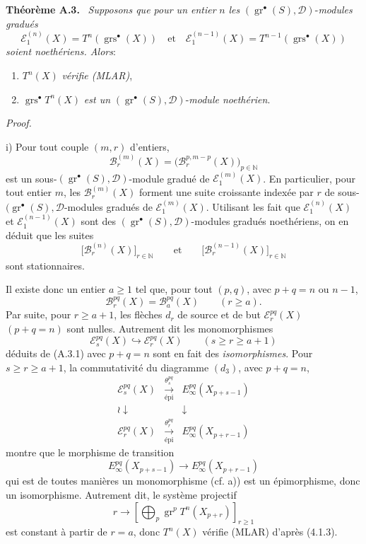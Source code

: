 \documentclass[11pt]{article}
\newenvironment{statement}[1]{\par\medskip\noindent\textbf{#1.}\ }{\par\medskip}
\newenvironment{prooftext}[1][Proof]{\par\noindent\emph{#1.}\ }{\par\medskip}
\providecommand{\gr}{\operatorname{gr}}
\providecommand{\gr}{\operatorname{gr}}
\providecommand{\gr}{\operatorname{gr}}
\providecommand{\grs}{\operatorname{grs}}
\begin{document}
\begin{statement}{Théorème A.3}
\emph{Supposons que pour un entier} \(n\) \emph{les} \((\gr^\bullet(S),\mathcal D)\)-\emph{modules gradués}
\[
\mathcal E_1^{(n)}(X)=T^n(\grs^\bullet(X))
\quad\text{et}\quad
\mathcal E_1^{(n-1)}(X)=T^{n-1}(\grs^\bullet(X))
\]
\emph{soient noethériens. Alors}:
\begin{enumerate}[label=\textup{(\roman*)}]
\item \(T^n(X)\) \emph{vérifie (MLAR)},
\item \(\grs^\bullet T^n(X)\) \emph{est un} \((\gr^\bullet(S),\mathcal D)\)-\emph{module noethérien}.
\end{enumerate}
\end{statement}

\begin{prooftext}

i) Pour tout couple \((m,r)\) d'entiers,
\[
\mathcal B_r^{(m)}(X)=\bigl(\mathcal B_r^{p,m-p}(X)\bigr)_{p\in\mathbb N}
\]
est un sous-\((\gr^\bullet(S),\mathcal D)\)-module gradué de \(\mathcal E_1^{(m)}(X)\). En particulier, pour tout entier \(m\), les \(\mathcal B_r^{(m)}(X)\) forment une suite croissante indexée par \(r\) de sous-\((\gr^\bullet(S),\mathcal D\)-modules gradués de \(\mathcal E_1^{(m)}(X)\). Utilisant les fait que \(\mathcal E_1^{(n)}(X)\) et \(\mathcal E_1^{(n-1)}(X)\) sont des \((\gr^\bullet(S),\mathcal D)\)-modules gradués noethériens, on en déduit que les suites
\[
\bigl[\mathcal B_r^{(n)}(X)\bigr]_{r\in\mathbb N}
\qquad\text{et}\qquad
\bigl[\mathcal B_r^{(n-1)}(X)\bigr]_{r\in\mathbb N}
\]
sont stationnaires.

Il
existe donc un entier \(a\ge1\) tel que, pour tout \((p,q)\), avec \(p+q=n\) ou \(n-1\),
\begin{equation}
\mathcal B_r^{pq}(X)=\mathcal B_a^{pq}(X)\qquad(r\ge a).
\tag{A.3.1}
\end{equation}
Par suite, pour \(r\ge a+1\), les flèches \(d_r\) de source et de but \(\mathcal E_r^{pq}(X)\) \((p+q=n)\) sont nulles. Autrement dit les monomorphismes
\[
\mathcal E_s^{pq}(X)\hookrightarrow\mathcal E_r^{pq}(X)\qquad(s\ge r\ge a+1)
\]
déduits de (A.3.1) avec \(p+q=n\) sont en fait des \emph{isomorphismes}. Pour \(s\ge r\ge a+1\), la commutativité du diagramme \((d_3)\), avec \(p+q=n\),
\[
\begin{array}{ccc}
\mathcal E_s^{pq}(X)&\xrightarrow[\text{épi}]{\theta_s^{pq}}&E_\infty^{pq}(X_{p+s-1})\\
\wr\downarrow&&\downarrow\\
\mathcal E_r^{pq}(X)&\xrightarrow[\text{épi}]{\theta_r^{pq}}&E_\infty^{pq}(X_{p+r-1})
\end{array}
\]
montre que le morphisme de transition
\[
E_\infty^{pq}(X_{p+s-1})\longrightarrow E_\infty^{pq}(X_{p+r-1})
\]
qui est de toutes manières un monomorphisme (cf. a)) est un épimorphisme, donc un isomorphisme. Autrement dit, le système projectif
\[
r\longrightarrow\left[\bigoplus_p\gr^p T^n(X_{p+r})\right]_{r\ge1}
\]
est constant à partir de \(r=a\), donc \(T^n(X)\) vérifie (MLAR) d'après (4.1.3).


\end{prooftext}
\end{document}
